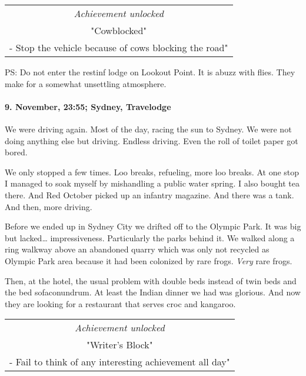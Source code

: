 \begin{center}
\begin{tabular}{||c||}
\emph{Achievement unlocked}\\
"Cowblocked"\\
\multicolumn{1}{||p{0.8\textwidth}||}{\footnotesize - Stop the vehicle because of cows blocking the road"} \\
\end{tabular}
\end{center}

PS: Do not enter the restinf lodge on Lookout Point.
It is abuzz with flies.
They make for a somewhat unsettling atmosphere.

\paragraph{9. November, 23:55; Sydney, Travelodge}
We were driving again.
Most of the day, racing the sun to Sydney.
We were not doing anything else but driving.
Endless driving.
Even the roll of toilet paper got bored.

We only stopped a few times.
Loo breaks, refueling, more loo breaks.
At one stop I managed to soak myself by mishandling a public water spring.
I also bought tea there.
And Red October picked up an infantry magazine.
And there was a tank.
And then, more driving.

Before we ended up in Sydney City we drifted off to the Olympic Park.
It was big but lacked\ldots{} impressiveness.
Particularly the parks behind it.
We walked along a ring walkway above an abandoned quarry which was only not recycled as Olympic Park area because it had been colonized by rare frogs.
\emph{Very} rare frogs.

Then, at the hotel, the usual problem with double beds instead of twin beds and the bed sofaconundrum.
At least the Indian dinner we had was glorious.
And now they are looking for a restaurant that serves croc and kangaroo.

\begin{center}
\begin{tabular}{||c||}
\emph{Achievement unlocked}\\
"Writer's Block"\\
\multicolumn{1}{||p{0.8\textwidth}||}{\footnotesize - Fail to think of any interesting achievement all day"} \\
\end{tabular}
\end{center}

